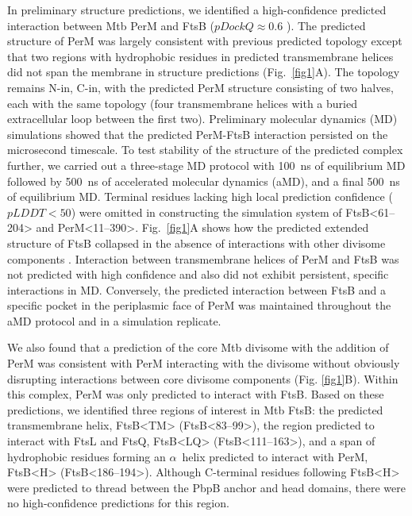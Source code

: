 \documentclass[pdflatex,sn-nature]{sn-jnl}%
\def\textsuperscript#1{<#1>}%
\newcommand\mtb{Mtb}
\newcommand\ftsbTM{FtsB\textsuperscript{TM}}
\newcommand\ftsbLQ{FtsB\textsuperscript{LQ}}
\newcommand\ftsbH{FtsB\textsuperscript{H}}
\begin{document}
In preliminary structure predictions, we identified a high-confidence predicted interaction between \mtb{} PerM and FtsB ($pDockQ \approx 0.6$ \citep{bryantImprovedPredictionProteinprotein2022}).
The predicted structure of PerM was largely consistent with previous predicted topology \citep{goodsmithDisruptionTuberculosisMembrane2015} except that two regions with hydrophobic residues in predicted transmembrane helices did not span the membrane in structure predictions (Fig.~\ref{fig1}A).
The topology remains N-in, C-in, with the predicted PerM structure consisting of two halves, each with the same topology (four transmembrane helices with a buried extracellular loop between the first two).
Preliminary molecular dynamics (MD) simulations showed that the predicted PerM-FtsB interaction persisted on the microsecond timescale.
To test stability of the structure of the predicted complex further, we carried out a three-stage MD protocol with \qty{100}{\ns} of equilibrium MD followed by \qty{500}{\ns} of accelerated molecular dynamics (aMD), and a final \qty{500}{\ns} of equilibrium MD.
Terminal residues lacking high local prediction confidence ($pLDDT < 50$) were omitted in constructing the simulation system of FtsB\textsuperscript{61--204} and PerM\textsuperscript{11--390}.
Fig.~\ref{fig1}A shows how the predicted extended structure of FtsB collapsed in the absence of interactions with other divisome components \citep{brittonConformationalChangesEssential2023,cravenModelInteractionsFtsQLB2022,attaibiUpdatedModelDivisome2022,kashammerCryoEMStructureBacterial2023}.
Interaction between transmembrane helices of PerM and FtsB was not predicted with high confidence and also did not exhibit persistent, specific interactions in MD.
Conversely, the predicted interaction between FtsB and a specific pocket in the periplasmic face of PerM was maintained throughout the aMD protocol and in a simulation replicate.

We also found that a prediction of the core \mtb{} divisome with the addition of PerM was consistent with PerM interacting with the divisome without obviously disrupting interactions between core divisome components (Fig. \ref{fig1}B).
Within this complex, PerM was only predicted to interact with FtsB.
Based on these predictions, we identified three regions of interest in \mtb{} FtsB: the predicted transmembrane helix, \ftsbTM{} (FtsB\textsuperscript{83--99}), the region predicted to interact with FtsL and FtsQ, \ftsbLQ{} (FtsB\textsuperscript{111--163}), and a span of hydrophobic residues forming an $\alpha$~helix predicted to interact with PerM, \ftsbH{} (FtsB\textsuperscript{186--194}).
Although C-terminal residues following \ftsbH{} were predicted to thread between the PbpB anchor and head domains, there were no high-confidence predictions for this region.
\end{document}
